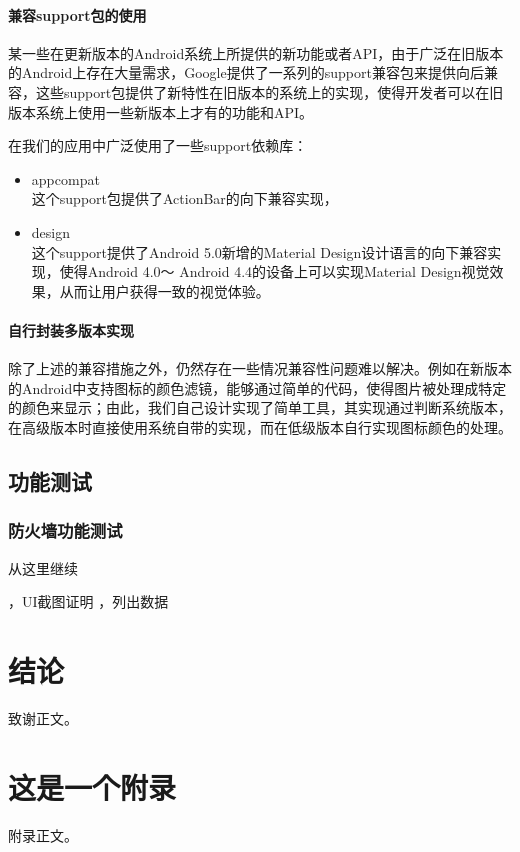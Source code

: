 \documentclass[format=final, language=chinese, degree=fyp]{hustthesis}
\begin{document}
\subsubsection{兼容support包的使用}

某一些在更新版本的Android系统上所提供的新功能或者API，由于广泛在旧版本的Android上存在大量需求，Google提供了一系列的support兼容包来提供向后兼容，这些support包提供了新特性在旧版本的系统上的实现，使得开发者可以在旧版本系统上使用一些新版本上才有的功能和API。

在我们的应用中广泛使用了一些support依赖库：
\begin{itemize}
	\item appcompat \\ 这个support包提供了ActionBar的向下兼容实现，
	\item design\\ 这个support提供了Android 5.0新增的Material Design设计语言的向下兼容实现，使得Android 4.0～ Android 4.4的设备上可以实现Material Design视觉效果，从而让用户获得一致的视觉体验。
\end{itemize}

\subsubsection{自行封装多版本实现}

除了上述的兼容措施之外，仍然存在一些情况兼容性问题难以解决。例如在新版本的Android中支持图标的颜色滤镜，能够通过简单的代码，使得图片被处理成特定的颜色来显示；由此，我们自己设计实现了简单工具，其实现通过判断系统版本，在高级版本时直接使用系统自带的实现，而在低级版本自行实现图标颜色的处理。


\section{功能测试}


\subsection{防火墙功能测试}


\todo 从这里继续



，UI截图证明
，列出数据




\chapter{结论}

\backmatter

\begin{ack}
致谢正文。
\end{ack}



\appendix

\chapter{这是一个附录}\label{appendix:1}
附录正文。
\end{document}
